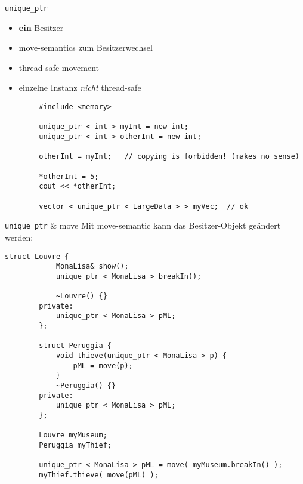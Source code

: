 \begin{frame}[fragile]{ \texttt{unique\_ptr} }
	\begin{itemize}
		\item \textbf{ein} Besitzer
		\item move-semantics zum Besitzerwechsel
		\item thread-safe movement
		\item einzelne Instanz \emph{nicht} thread-safe
	\end{itemize}
	
	\begin{lstlisting}
		#include <memory>
		
		unique_ptr < int > myInt = new int;
		unique_ptr < int > otherInt = new int;
		
		otherInt = myInt;	// copying is forbidden! (makes no sense)
		
		*otherInt = 5;
		cout << *otherInt;
		
		vector < unique_ptr < LargeData > > myVec;	// ok
	\end{lstlisting}
\end{frame}

\begin{frame}[fragile]{ \texttt{unique\_ptr} \& move }
	Mit move-semantic kann das Besitzer-Objekt geändert werden:
	
	\begin{lstlisting}[basicstyle=\tiny]
		struct Louvre {
		    MonaLisa& show();
		    unique_ptr < MonaLisa > breakIn();
			
		    ~Louvre() {}
		private:
		    unique_ptr < MonaLisa > pML;
		};
		
		struct Peruggia {
		    void thieve(unique_ptr < MonaLisa > p) {
		        pML = move(p);
		    }
		    ~Peruggia() {}
		private:
		    unique_ptr < MonaLisa > pML;
		};
		
		Louvre myMuseum;
		Peruggia myThief;
		
		unique_ptr < MonaLisa > pML = move( myMuseum.breakIn() );
		myThief.thieve( move(pML) );
	\end{lstlisting}
\end{frame}


